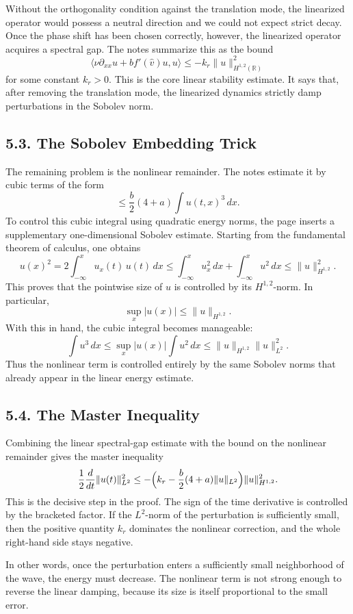 \documentclass[11pt]{article}
\theoremstyle{definition}
\theoremstyle{remark}
\begin{document}
Without the orthogonality condition against the translation mode, the linearized operator would possess a neutral direction and we could not expect strict decay. Once the phase shift has been chosen correctly, however, the linearized operator acquires a spectral gap. The notes summarize this as the bound
\[
\langle \nu\partial_{xx}u+bf'(\widehat v)u,u\rangle
\le -k_r\|u\|_{H^{1,2}(\mathbb R)}^2
\]
for some constant \(k_r>0\). This is the core linear stability estimate. It says that, after removing the translation mode, the linearized dynamics strictly damp perturbations in the Sobolev norm.

\subsection*{5.3. The Sobolev Embedding Trick}
The remaining problem is the nonlinear remainder. The notes estimate it by cubic terms of the form
\[
\le \frac{b}{2}(4+a)\int u(t,x)^3\,dx.
\]
To control this cubic integral using quadratic energy norms, the page inserts a supplementary one-dimensional Sobolev estimate. Starting from the fundamental theorem of calculus, one obtains
\[
u(x)^2
=2\int_{-\infty}^x u_x(t)\,u(t)\,dx
\le \int_{-\infty}^x u_x^2\,dx+\int_{-\infty}^x u^2\,dx
\le \|u\|_{H^{1,2}}^2.
\]
This proves that the pointwise size of \(u\) is controlled by its \(H^{1,2}\)-norm. In particular,
\[
\sup_x |u(x)|\le \|u\|_{H^{1,2}}.
\]
With this in hand, the cubic integral becomes manageable:
\[
\int u^3\,dx\le \sup_x|u(x)|\int u^2\,dx
\le \|u\|_{H^{1,2}}\|u\|_{L^2}^2.
\]
Thus the nonlinear term is controlled entirely by the same Sobolev norms that already appear in the linear energy estimate.

\subsection*{5.4. The Master Inequality}
Combining the linear spectral-gap estimate with the bound on the nonlinear remainder gives the master inequality
\[
\frac12\frac{d}{dt}\|u(t)\|_{L^2}^2
\le
-\Bigl(k_r-\frac{b}{2}(4+a)\|u\|_{L^2}\Bigr)\|u\|_{H^{1,2}}^2.
\]
This is the decisive step in the proof. The sign of the time derivative is controlled by the bracketed factor. If the \(L^2\)-norm of the perturbation is sufficiently small, then the positive quantity \(k_r\) dominates the nonlinear correction, and the whole right-hand side stays negative.

In other words, once the perturbation enters a sufficiently small neighborhood of the wave, the energy must decrease. The nonlinear term is not strong enough to reverse the linear damping, because its size is itself proportional to the small error.
\end{document}
